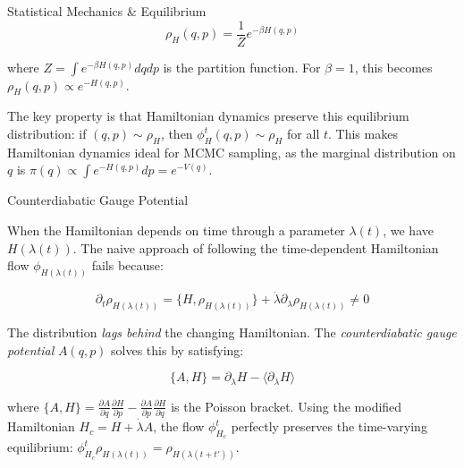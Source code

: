\documentclass[final]{beamer}
\newlength{\colwidth}
\begin{document}
\begin{frame}[t]
\begin{columns}[t]
\begin{column}{\colwidth}
\begin{block}{Statistical Mechanics \& Equilibrium}
\begin{equation}
\rho_H(q,p) = \frac{1}{Z} e^{-\beta H(q,p)}
\end{equation}

where $Z = \int e^{-\beta H(q,p)} dq dp$ is the partition function. For $\beta=1$, this becomes $\rho_H(q,p) \propto e^{-H(q,p)}$.

The key property is that Hamiltonian dynamics preserve this equilibrium distribution: if $(q,p) \sim \rho_H$, then $\phi_H^t(q,p) \sim \rho_H$ for all $t$. This makes Hamiltonian dynamics ideal for MCMC sampling, as the marginal distribution on $q$ is $\pi(q) \propto \int e^{-H(q,p)} dp = e^{-V(q)}$.

\begin{center}
\end{center}

  \end{block}

  \begin{block}{Counterdiabatic Gauge Potential}

When the Hamiltonian depends on time through a parameter $\lambda(t)$, we have $H(\lambda(t))$. The naive approach of following the time-dependent Hamiltonian flow $\phi_{H(\lambda(t))}$ fails because:

\begin{equation}
\partial_t \rho_{H(\lambda(t))} = \{H, \rho_{H(\lambda(t))}\} + \dot{\lambda} \partial_\lambda \rho_{H(\lambda(t))} \neq 0
\end{equation}

The distribution \emph{lags behind} the changing Hamiltonian. The \emph{counterdiabatic gauge potential} $A(q,p)$ solves this by satisfying:

\begin{equation}
\{A, H\} = \partial_\lambda H - \langle \partial_\lambda H \rangle
\end{equation}

where $\{A, H\} = \frac{\partial A}{\partial q} \frac{\partial H}{\partial p} - \frac{\partial A}{\partial p} \frac{\partial H}{\partial q}$ is the Poisson bracket. Using the modified Hamiltonian $H_c = H + \dot{\lambda} A$, the flow $\phi_{H_c}^t$ perfectly preserves the time-varying equilibrium: $\phi_{H_c}^t \rho_{H(\lambda(t))} = \rho_{H(\lambda(t+t'))}$.

\begin{center}
\end{center}


\end{block}
\end{column}
\end{columns}
\end{frame}
\end{document}
